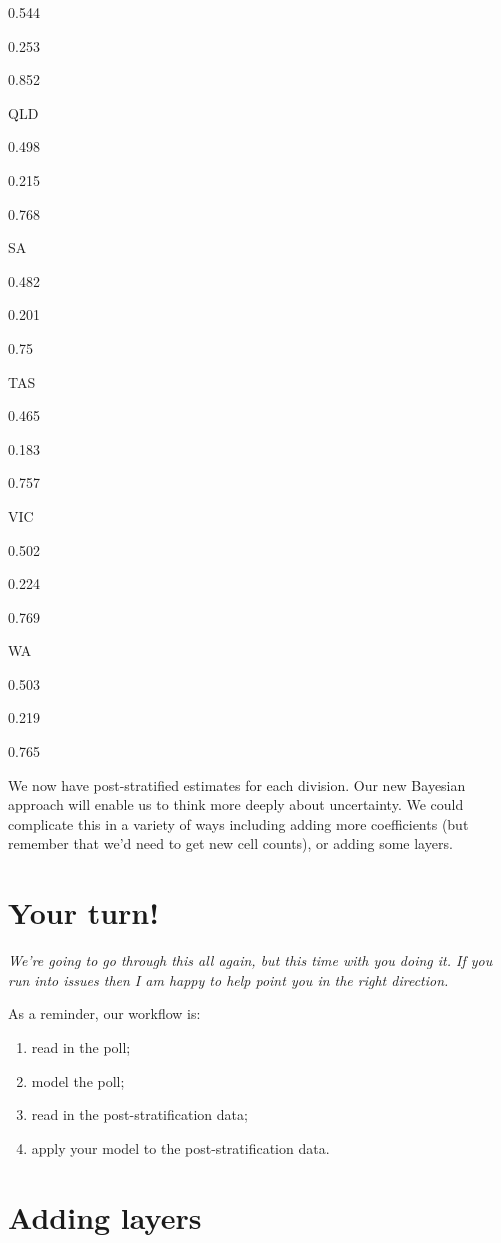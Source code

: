 \documentclass[
]{book}
\providecommand{\tightlist}{%
  \setlength{\itemsep}{0pt}\setlength{\parskip}{0pt}}
\begin{document}
0.544

0.253

0.852

QLD

0.498

0.215

0.768

SA

0.482

0.201

0.75~

TAS

0.465

0.183

0.757

VIC

0.502

0.224

0.769

WA

0.503

0.219

0.765

We now have post-stratified estimates for each division. Our new Bayesian approach will enable us to think more deeply about uncertainty. We could complicate this in a variety of ways including adding more coefficients (but remember that we'd need to get new cell counts), or adding some layers.

\hypertarget{your-turn-1}{%
\section{Your turn!}\label{your-turn-1}}

\emph{We're going to go through this all again, but this time with you doing it. If you run into issues then I am happy to help point you in the right direction.}

As a reminder, our workflow is:

\begin{enumerate}
\def\labelenumi{\arabic{enumi})}
\tightlist
\item
  read in the poll;
\item
  model the poll;
\item
  read in the post-stratification data;
\item
  apply your model to the post-stratification data.
\end{enumerate}

\hypertarget{adding-layers}{%
\section{Adding layers}\label{adding-layers}}
\end{document}
